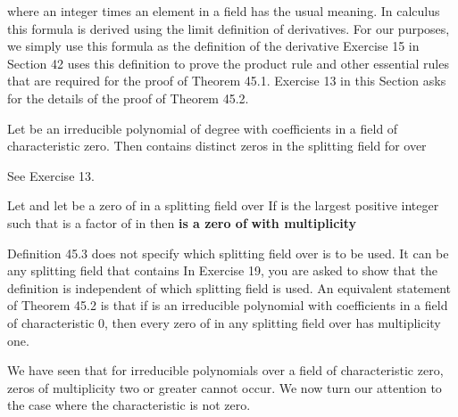 \documentclass[11pt,oneside]{article}
\begin{document}
\BookNarrativetrue

\begin{BookBody}

\noindent where an integer times an element in a field has the usual meaning. In calculus this formula is derived using the limit definition of derivatives. For our purposes, we simply use this formula as the definition of the derivative Exercise 15 in Section 42 uses this definition to prove the product rule and other essential rules that are required for the proof of Theorem 45.1. Exercise 13 in this Section asks for the details of the proof of Theorem 45.2.

 Let  be an irreducible polynomial of degree  with coefficients in a field  of characteristic zero. Then  contains  distinct zeros in the splitting field for  over 

 See Exercise 13. \BookEnd{\blacklozenge}

 Let  and let \BookInline{\alpha } be a zero of  in a splitting field  over  If \BookInline{\nu } is the largest positive integer such that  is a factor of  in  then \BookInline{\alpha } \textbf{is a zero of}  \textbf{with multiplicity} \BookEnd{\blacksquare}

Definition 45.3 does not specify which splitting field over  is to be used. It can be any splitting field that contains  In Exercise 19, you are asked to show that the definition is independent of which splitting field is used. An equivalent statement of Theorem 45.2 is that if  is an irreducible polynomial with coefficients in a field  of characteristic 0, then every zero of  in any splitting field over  has multiplicity one.


\noindent We have seen that for irreducible polynomials over a field  of characteristic zero, zeros of multiplicity two or greater cannot occur. We now turn our attention to the case where the characteristic is not zero.


\end{BookBody}
\end{document}
